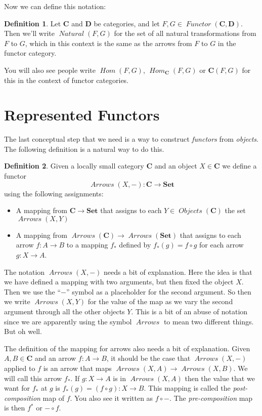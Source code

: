 \documentclass[12pt]{article}
\theoremstyle{definition}
\theoremstyle{definition}
\newtheorem{defn}{Definition}[]
\theoremstyle{definition}
\numberwithin{equation}{section}
\newcommand{\cat}[1]{\mathbf{#1}}      %
\newcommand{\fcat}[1]{{\mathbf {#1}}}    %
\newcommand{\CC}{\cat{C}}
\newcommand{\DD}{\cat{D}}
\DeclareMathOperator{\Arrows}{\mathit{Arrows}}
\DeclareMathOperator{\Objects}{\mathit{Objects}}
\DeclareMathOperator{\Hom}{\mathit{Hom}}
\DeclareMathOperator{\Nat}{\mathit{Natural}}
\DeclareMathOperator{\Fun}{\mathit{Functor}}
\newcommand{\Set}{\fcat{Set}}           %
\def\ni{\goodbreak\noindent}
\begin{document}
Now we can define this notation:

\begin{defn}
Let $\CC$ and $\DD$ be categories, and let $F, G \in \Fun(\CC, \DD)$. Then
we'll write $\Nat(F, G)$ for the set of all natural transformations from $F$ to $G$, which
in this context is the same as the arrows from $F$ to $G$ in the functor category.
\end{defn}
\ni
You will also see people write $\Hom(F, G)$, $\Hom_{\CC}(F,G)$ or $\CC(F, G)$ for this in the context
of functor categories.

\section{Represented Functors}

The last conceptual step that we need is a way to construct {\it functors} from {\it
objects}. The following definition is a natural way to do this.

\begin{defn}
Given a locally small category $\CC$ and an object $X \in \CC$ we define a functor
$$
\Arrows(X,-) : \CC \to \Set
$$
using the following assignments:
\begin{itemize}
\item A mapping from $\CC \to \Set$ that assigns to each $Y \in \Objects(\CC)$ the set
$\Arrows(X,Y)$
\item A mapping from $\Arrows(\CC) \to \Arrows(\Set) $ that assigns to each arrow $f: A
\to B$ to a mapping $f_*$ defined by $f_*(g) = f\circ g$ for each arrow $g: X \to A$.
\end{itemize}
\end{defn}

The notation $\Arrows(X,-)$ needs a bit of explanation. Here the idea is that we have defined
a mapping with two arguments, but then fixed the object $X$. 
Then we use the ``$-$'' symbol as a 
placeholder for the second argument. So then we write $\Arrows(X,Y)$ for
the value of the map as we vary the second argument through all the other objects $Y$. 
This is a bit of an abuse of notation since we 
are apparently using the symbol $\Arrows$ to mean two different things. But oh well.

The definition of the mapping for arrows also needs a bit of explanation.
Given $A,B \in \CC$ and an arrow $f: A \to B$, it should be the case that $\Arrows(X,-)$ 
applied to $f$ is an arrow that maps $\Arrows(X,A) \to \Arrows(X,B)$.
We will call this arrow $f_*$.  
If $g: X \to A$ is in $\Arrows(X,A)$
then the value 
that we want for $f_*$ at $g$ is $f_*(g) = (f \circ g): X \to B$.
This mapping is called the {\it post-composition} map of $f$.
You also see it written as $f \circ -$.
The {\it pre-composition} map is then $f^*$ or $- \circ f$.
\end{document}
